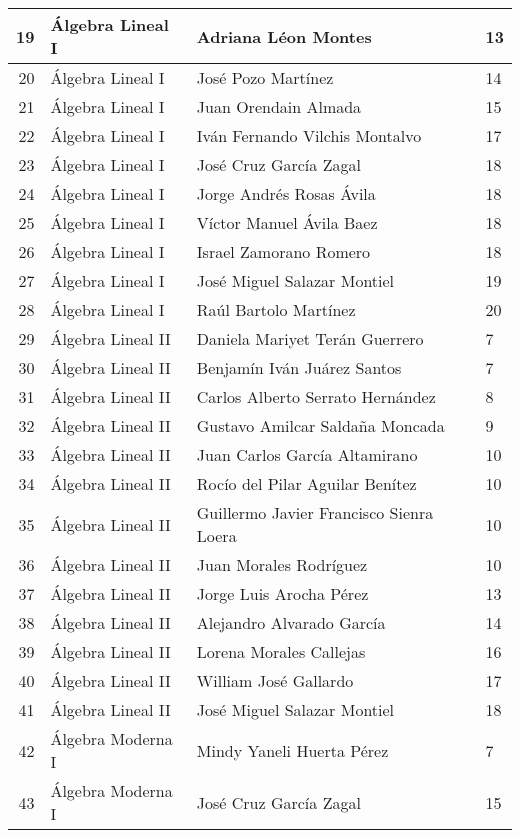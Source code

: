 \begin{table}[ht]
\begin{tabular}{rlll}
19 & Álgebra Lineal I & Adriana Léon Montes & 13 \\ \hline
20 & Álgebra Lineal I & José Pozo Martínez & 14 \\ \hline
21 & Álgebra Lineal I & Juan Orendain Almada & 15 \\ \hline
22 & Álgebra Lineal I & Iván Fernando Vilchis Montalvo & 17 \\ \hline
23 & Álgebra Lineal I & José Cruz García Zagal & 18 \\ \hline
24 & Álgebra Lineal I & Jorge Andrés Rosas Ávila & 18 \\ \hline
25 & Álgebra Lineal I & Víctor Manuel Ávila Baez & 18 \\ \hline
26 & Álgebra Lineal I & Israel Zamorano Romero & 18 \\ \hline
27 & Álgebra Lineal I & José Miguel Salazar Montiel & 19 \\ \hline
28 & Álgebra Lineal I & Raúl Bartolo Martínez & 20 \\ \hline
29 & Álgebra Lineal II & Daniela Mariyet Terán Guerrero & 7 \\ \hline
30 & Álgebra Lineal II & Benjamín Iván Juárez Santos & 7 \\ \hline
31 & Álgebra Lineal II & Carlos Alberto Serrato Hernández & 8 \\ \hline
32 & Álgebra Lineal II & Gustavo Amilcar Saldaña Moncada & 9 \\ \hline
33 & Álgebra Lineal II & Juan Carlos García Altamirano & 10 \\ \hline
34 & Álgebra Lineal II & Rocío del Pilar Aguilar Benítez & 10 \\ \hline
35 & Álgebra Lineal II & Guillermo Javier Francisco Sienra Loera & 10 \\ \hline
36 & Álgebra Lineal II & Juan Morales Rodríguez & 10 \\ \hline
37 & Álgebra Lineal II & Jorge Luis Arocha Pérez & 13 \\ \hline
38 & Álgebra Lineal II & Alejandro Alvarado García & 14 \\ \hline
39 & Álgebra Lineal II & Lorena Morales Callejas & 16 \\ \hline
40 & Álgebra Lineal II & William José Gallardo & 17 \\ \hline
41 & Álgebra Lineal II & José Miguel Salazar Montiel & 18 \\ \hline
42 & Álgebra Moderna I & Mindy Yaneli Huerta Pérez & 7 \\ \hline
43 & Álgebra Moderna I & José Cruz García Zagal & 15 \\ \hline

\end{tabular}
\end{table}
